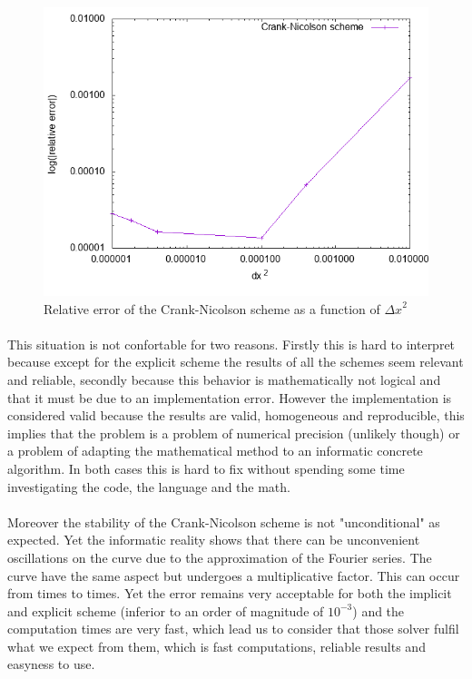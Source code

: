 \documentclass[a4paper, twoside, 11pt]{report}
\theoremstyle{theorem}
\theoremstyle{remark}
\theoremstyle{exemple}
\begin{document}
            \begin{figure}[h!]
                \begin{center}
                    \includegraphics[scale=0.42]{images/error-dxdx.png}
                    \caption{Relative error of the Crank-Nicolson scheme as a function of ${\Delta x}^{2}$}
                \end{center}
            \end{figure}

            \paragraph{}This situation is not confortable for two reasons. Firstly this is hard to interpret because except for the explicit scheme the results of all the schemes seem relevant and reliable, secondly because this behavior is mathematically not logical and that it must be due to an implementation error. However the implementation is considered valid because the results are valid, homogeneous and reproducible, this implies that the problem is a problem of numerical precision (unlikely though) or a problem of adapting the mathematical method to an informatic concrete algorithm. In both cases this is hard to fix without spending some time investigating the code, the language and the math.

            \paragraph{}Moreover the stability of the Crank-Nicolson scheme is not "unconditional" as expected. Yet the informatic reality shows that there can be unconvenient oscillations on the curve due to the approximation of the Fourier series. The curve have the same aspect but undergoes a multiplicative factor. This can occur from times to times. Yet the error remains very acceptable for both the implicit and explicit scheme (inferior to an order of magnitude of ${10}^{-3}$) and the computation times are very fast, which lead us to consider that those solver fulfil what we expect from them, which is fast computations, reliable results and easyness to use.
\end{document}
